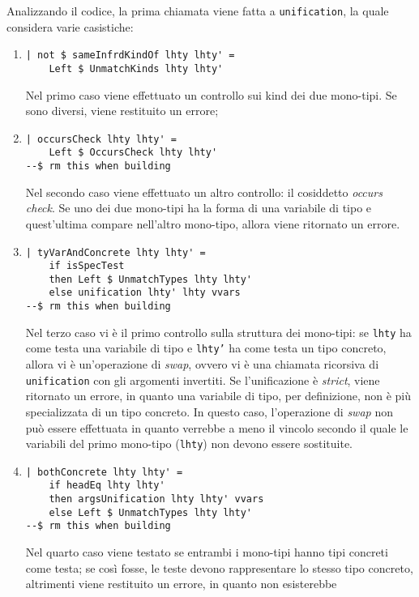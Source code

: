 \documentclass[10pt,a4paper]{article}
\begin{document}
Analizzando il codice, la prima chiamata viene fatta a \texttt{unification}, la quale considera varie casistiche:
\begin{enumerate}
    \item
    \begin{lstlisting}
| not $ sameInfrdKindOf lhty lhty' =
    Left $ UnmatchKinds lhty lhty'
    \end{lstlisting}
    Nel primo caso viene effettuato un controllo sui kind dei due mono-tipi. Se sono diversi, viene restituito un errore;
    \item
    \begin{lstlisting}
| occursCheck lhty lhty' =
    Left $ OccursCheck lhty lhty'
--$ rm this when building
    \end{lstlisting}
    Nel secondo caso viene effettuato un altro controllo: il cosiddetto \textit{occurs check}. Se uno dei due mono-tipi
    ha la forma di una variabile di tipo e quest'ultima compare nell'altro mono-tipo, allora viene ritornato un errore.
    \item
    \begin{lstlisting}
| tyVarAndConcrete lhty lhty' =
    if isSpecTest
    then Left $ UnmatchTypes lhty lhty'
    else unification lhty' lhty vvars
--$ rm this when building
    \end{lstlisting}
    Nel terzo caso vi è il primo controllo sulla struttura dei mono-tipi: se \texttt{lhty} ha come testa una variabile
    di tipo e \texttt{lhty'} ha come testa un tipo concreto, allora vi è un'operazione di \textit{swap}, ovvero vi è
    una chiamata ricorsiva di \texttt{unification} con gli argomenti invertiti. Se l'unificazione è \textit{strict},
    viene ritornato un errore, in quanto una variabile di tipo, per definizione, non è più specializzata di un tipo
    concreto. In questo caso, l'operazione di \textit{swap} non può essere effettuata in quanto verrebbe a meno il vincolo
    secondo il quale le variabili del primo mono-tipo (\texttt{lhty}) non devono essere sostituite.
    \item
    \begin{lstlisting}
| bothConcrete lhty lhty' =
    if headEq lhty lhty'
    then argsUnification lhty lhty' vvars
    else Left $ UnmatchTypes lhty lhty'
--$ rm this when building
    \end{lstlisting}
    Nel quarto caso viene testato se entrambi i mono-tipi hanno tipi concreti come testa; se così fosse, le teste
    devono rappresentare lo stesso tipo concreto, altrimenti viene restituito un errore, in quanto non esisterebbe

\end{enumerate}
\end{document}
